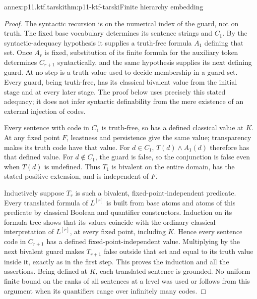 \begin{annexitem}{annex:p11.ktf.tarski}{thm:p11-ktf-tarski}{Finite hierarchy embedding}
\begin{proof}
The syntactic recursion is on the numerical index of the guard, not on
truth. The fixed base vocabulary determines its sentence strings and
\(C_1\). By the syntactic-adequacy hypothesis it supplies a truth-free
formula \(A_1\) defining that set. Once \(A_r\) is fixed, substitution
of its finite formula for the auxiliary token determines \(C_{r+1}\)
syntactically, and the same hypothesis supplies its next defining guard.
At no step is a truth value used to decide membership in a guard set.
Every guard, being truth-free, has its classical bivalent value from the
initial stage and at every later stage. The proof below uses precisely
this stated adequacy; it does not infer syntactic definability from
the mere existence of an external injection of codes.

Every sentence with code in \(C_1\) is truth-free, so has a defined
classical value at \(K\). At any fixed point \(F\), leastness and
persistence give the same value; transparency makes its truth code have
that value. For \(d\in C_1\), \(T(d)\land A_1(d)\) therefore
has that defined value. For \(d\notin C_1\), the guard is false,
so the conjunction is false even when \(T(d)\) is undefined.
Thus \(T_1\) is bivalent on the entire domain, has the stated positive
extension, and is independent of \(F\).

Inductively suppose \(T_r\) is such a bivalent, fixed-point-independent
predicate. Every translated formula of \(L^{[r]}\) is built from
base atoms and atoms of this predicate by classical Boolean and quantifier
constructors. Induction on its formula tree shows that its values coincide
with the ordinary classical interpretation of \(L^{[r]}\), at every
fixed point, including \(K\). Hence every sentence code in
\(C_{r+1}\) has a defined fixed-point-independent value. Multiplying
by the next bivalent guard makes \(T_{r+1}\) false outside that set
and equal to its truth value inside it, exactly as in the first step.
This proves the induction and all the assertions. Being defined at
\(K\), each translated sentence is grounded. No uniform finite bound
on the ranks of all sentences at a level was used or follows from this
argument when its quantifiers range over infinitely many codes.
\end{proof}
\end{annexitem}

